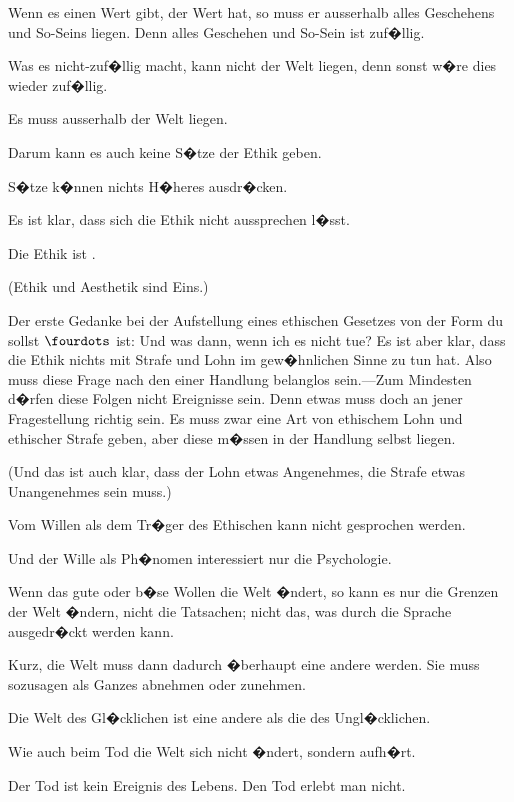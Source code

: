 \begin{propositions}
{Wenn es einen Wert gibt, der Wert hat, so muss
er ausserhalb alles Geschehens und So-Seins liegen.
Denn alles Geschehen und So-Sein ist zuf�llig.

Was es nicht-zuf�llig macht, kann nicht  der
Welt liegen, denn sonst w�re dies wieder zuf�llig.

Es muss ausserhalb der Welt liegen.}


{Darum kann es auch keine S�tze der Ethik geben.

S�tze k�nnen nichts H�heres ausdr�cken.}


{Es ist klar, dass sich die Ethik nicht aussprechen
l�sst.

Die Ethik ist .

(Ethik und Aesthetik sind Eins.)}


{Der erste Gedanke bei der Aufstellung eines
ethischen Gesetzes von der Form \glqq{}du sollst $\fourdots$\grqq{}
ist: Und was dann, wenn ich es nicht tue? Es ist
aber klar, dass die Ethik nichts mit Strafe und
Lohn im gew�hnlichen Sinne zu tun hat. Also
muss diese Frage nach den  einer Handlung
belanglos sein.---Zum Mindesten d�rfen diese
Folgen nicht Ereignisse sein. Denn etwas muss
doch an jener Fragestellung richtig sein. Es muss
zwar eine Art von ethischem Lohn und ethischer
Strafe geben, aber diese m�ssen in der Handlung
selbst liegen.

(Und das ist auch klar, dass der Lohn etwas
Angenehmes, die Strafe etwas Unangenehmes sein
muss.)}


{Vom Willen als dem Tr�ger des Ethischen kann
nicht gesprochen werden.

Und der Wille als Ph�nomen interessiert nur
die Psychologie.}


{Wenn das gute oder b�se Wollen die Welt
�ndert, so kann es nur die Grenzen der Welt �ndern,
nicht die Tatsachen; nicht das, was durch die
Sprache ausgedr�ckt werden kann.

Kurz, die Welt muss dann dadurch �berhaupt
eine andere werden. Sie muss sozusagen als
Ganzes abnehmen oder zunehmen.

Die Welt des Gl�cklichen ist eine andere als die
des Ungl�cklichen.}


{Wie auch beim Tod die Welt sich nicht �ndert,
sondern aufh�rt.}


{Der Tod ist kein Ereignis des Lebens. Den
Tod erlebt man nicht.

}
\end{propositions}
